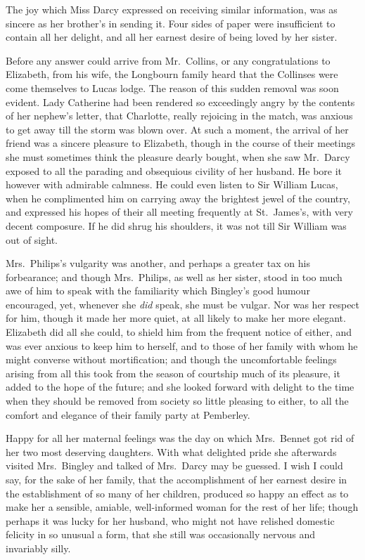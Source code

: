 The joy which Miss Darcy expressed on receiving similar
information, was as sincere as her brother’s in sending it.
Four sides of paper were insufficient to contain all her
delight, and all her earnest desire of being loved by her
sister.

Before any answer could arrive from Mr.\ Collins, or any
congratulations to Elizabeth, from his wife, the Longbourn
family heard that the Collinses were come themselves to
Lucas lodge. The reason of this sudden removal was soon
evident. Lady Catherine had been rendered so exceedingly
angry by the contents of her nephew’s letter, that
Charlotte, really rejoicing in the match, was anxious to
get away till the storm was blown over. At such a moment,
the arrival of her friend was a sincere pleasure to Elizabeth,
though in the course of their meetings she must sometimes
think the pleasure dearly bought, when she saw Mr.\ Darcy
exposed to all the parading and obsequious civility of her
husband. He bore it however with admirable calmness.
He could even listen to Sir William Lucas, when he complimented
him on carrying away the brightest jewel of
the country, and expressed his hopes of their all meeting
frequently at St.\ James’s, with very decent composure.
If he did shrug his shoulders, it was not till Sir William
was out of sight.

Mrs.\ Philips’s vulgarity was another, and perhaps a
great\-er tax on his forbearance; and though Mrs.\ Philips,
as well as her sister, stood in too much awe of him to
speak with the familiarity which Bingley’s good humour
encouraged, yet, whenever she \textit{did} speak, she must be
vulgar. Nor was her respect for him, though it made her
more quiet, at all likely to make her more elegant. Elizabeth
did all she could, to shield him from the frequent
notice of either, and was ever anxious to keep him to
herself, and to those of her family with whom he might
converse without mortification; and though the uncomfortable
feelings arising from all this took from the season
of courtship much of its pleasure, it added to the hope of the
future; and she looked forward with delight to the time
when they should be removed from society so little
pleasing to either, to all the comfort and elegance of their
family party at Pemberley.


Happy for all her maternal feelings was the day on
which Mrs.\ Bennet got rid of her two most deserving
daughters. With what delighted pride she afterwards
visited Mrs.\ Bingley and talked of Mrs.\ Darcy may be
guessed. I wish I could say, for the sake of her family,
that the accomplishment of her earnest desire in the
establishment of so many of her children, produced so
happy an effect as to make her a sensible, amiable, well-informed
woman for the rest of her life; though perhaps
it was lucky for her husband, who might not have relished
domestic felicity in so unusual a form, that she still was
occasionally nervous and invariably silly.


